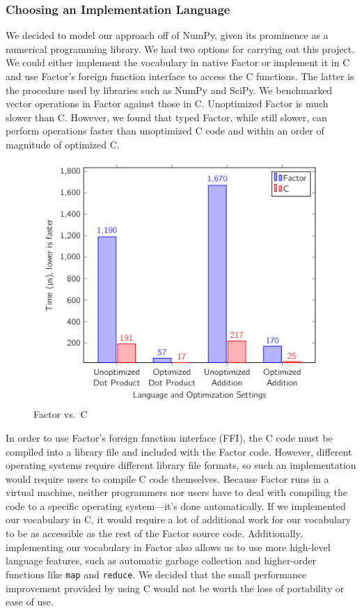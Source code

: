 \documentclass[
]{article}
\begin{document}
\hypertarget{choosing-an-implementation-language}{%
\subsubsection{Choosing an Implementation
Language}\label{choosing-an-implementation-language}}

We decided to model our approach off of NumPy, given its prominence as a
numerical programming library. We had two options for carrying out this
project. We could either implement the vocabulary in native Factor or
implement it in C and use Factor's foreign function interface to access
the C functions. The latter is the procedure used by libraries such as
NumPy and SciPy. We benchmarked vector operations in Factor against
those in C. Unoptimized Factor is much slower than C. However, we found
that typed Factor, while still slower, can perform operations faster
than unoptimized C code and within an order of magnitude of optimized C.

\begin{figure}
\centering
\includegraphics{factor_vs_c.png}
\caption{Factor vs.~C}
\end{figure}

In order to use Factor's foreign function interface (FFI), the C code
must be compiled into a library file and included with the Factor code.
However, different operating systems require different library file
formats, so such an implementation would require users to compile C code
themselves. Because Factor runs in a virtual machine, neither
programmers nor users have to deal with compiling the code to a specific
operating system---it's done automatically. If we implemented our
vocabulary in C, it would require a lot of additional work for our
vocabulary to be as accessible as the rest of the Factor source code.
Additionally, implementing our vocabulary in Factor also allows us to
use more high-level language features, such as automatic garbage
collection and higher-order functions like \texttt{map} and
\texttt{reduce}. We decided that the small performance improvement
provided by using C would not be worth the loss of portability or ease
of use.
\end{document}

